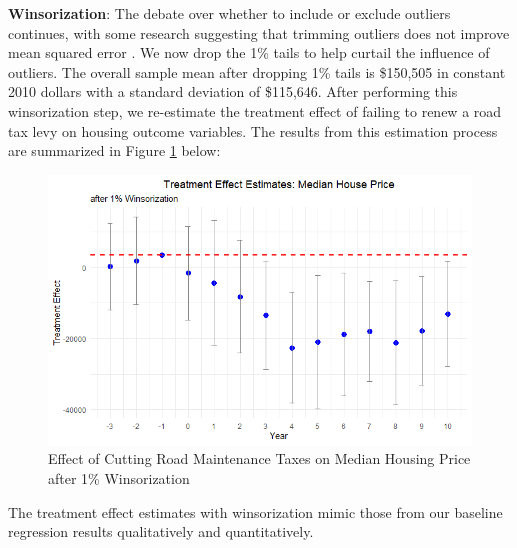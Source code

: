 \textbf{Winsorization}: The debate over whether to include or exclude outliers continues, with some research suggesting that trimming outliers does not improve mean squared error \citep{bollinger2005}. We now drop the 1\% tails to help curtail the influence of outliers. The overall sample mean after dropping 1\% tails is \$150,505 in constant 2010 dollars with a standard deviation of \$115,646. After performing this winsorization step, we re-estimate the treatment effect of failing to renew a road tax levy on housing outcome variables. The results from this estimation process are summarized in Figure \ref{fig:tes_g_w} below:

\begin{figure}[htbp]
    \centering
    \includegraphics[width=\textwidth,keepaspectratio]{images/tes_g_w_reg.png}    
    \caption{Effect of Cutting Road Maintenance Taxes on Median Housing Price after 1\% Winsorization}    
    \label{fig:tes_g_w}
\end{figure}

The treatment effect estimates with winsorization mimic those from our baseline regression results qualitatively and quantitatively.


